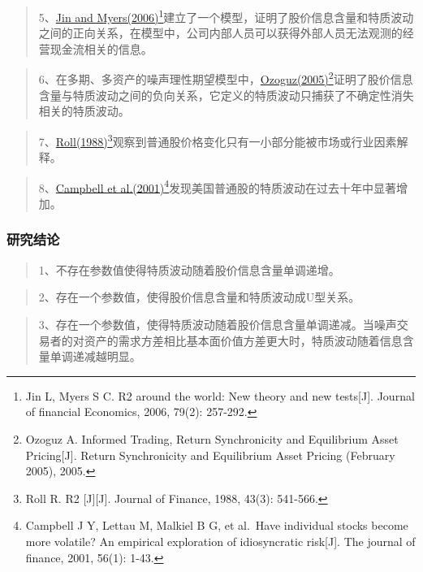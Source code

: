 \documentclass[
]{article}
\begin{document}
\begin{quote}
5、\href{https://doi.org/10.1016/j.jfineco.2004.11.003}{Jin and
Myers(2006)}\footnote{Jin L, Myers S C. R2 around the world: New theory
  and new tests{[}J{]}. Journal of financial Economics, 2006, 79(2):
  257-292.}建立了一个模型，证明了股价信息含量和特质波动之间的正向关系，在模型中，公司内部人员可以获得外部人员无法观测的经营现金流相关的信息。
\end{quote}

\begin{quote}
6、在多期、多资产的噪声理性期望模型中，\href{https://dx.doi.org/10.2139/ssrn.676113}{Ozoguz(2005)}\footnote{Ozoguz
  A. Informed Trading, Return Synchronicity and Equilibrium Asset
  Pricing{[}J{]}. Return Synchronicity and Equilibrium Asset Pricing
  (February 2005), 2005.}证明了股价信息含量与特质波动之间的负向关系，它定义的特质波动只捕获了不确定性消失相关的特质波动。
\end{quote}

\begin{quote}
7、\href{}{Roll(1988)}\footnote{Roll R. R2 {[}J{]}{[}J{]}. Journal of
  Finance, 1988, 43(3): 541-566.}观察到普通股价格变化只有一小部分能被市场或行业因素解释。
\end{quote}

\begin{quote}
8、\href{https://doi.org/10.1111/0022-1082.00318}{Campbell et
al.(2001)}\footnote{Campbell J Y, Lettau M, Malkiel B G, et al.~Have
  individual stocks become more volatile? An empirical exploration of
  idiosyncratic risk{[}J{]}. The journal of finance, 2001, 56(1): 1-43.}发现美国普通股的特质波动在过去十年中显著增加。
\end{quote}

\hypertarget{ux7814ux7a76ux7ed3ux8bba-2}{%
\subsubsection{研究结论}\label{ux7814ux7a76ux7ed3ux8bba-2}}

\begin{quote}
1、不存在参数值使得特质波动随着股价信息含量单调递增。
\end{quote}

\begin{quote}
2、存在一个参数值，使得股价信息含量和特质波动成U型关系。
\end{quote}

\begin{quote}
3、存在一个参数值，使得特质波动随着股价信息含量单调递减。当噪声交易者的对资产的需求方差相比基本面价值方差更大时，特质波动随着信息含量单调递减越明显。
\end{quote}
\end{document}
